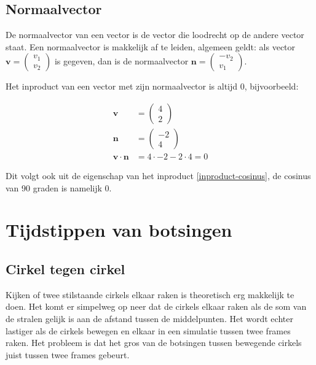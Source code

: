 \documentclass[12pt,a4paper]{article}
\begin{document}
	\subsection{Normaalvector}
	De normaalvector van een vector is de vector die loodrecht op de andere vector staat. Een normaalvector is makkelijk af te leiden, algemeen geldt: als vector $\mathbf{v}=\begin{pmatrix} v_1 \\ v_2 \end{pmatrix}$ is gegeven, dan is de normaalvector $\mathbf{n}=\begin{pmatrix} -v_2 \\ v_1 \end{pmatrix}$.
	
	Het inproduct van een vector met zijn normaalvector is altijd 0, bijvoorbeeld:
	
	\begin{equation}
		\begin{aligned}
			\mathbf{v} &= \begin{pmatrix} 4 \\ 2 \end{pmatrix}\\
			\mathbf{n} &= \begin{pmatrix} -2 \\ 4 \end{pmatrix} \\
			\mathbf{v} \cdot \mathbf{n} &= 4 \cdot -2 - 2 \cdot 4 = 0
		\end{aligned}
	\end{equation}
	
	Dit volgt ook uit de eigenschap van het inproduct \eqref{inproduct-cosinus}, de cosinus van 90 graden is namelijk 0.

	\newpage

	\section{Tijdstippen van botsingen}
	
	\subsection{Cirkel tegen cirkel}
	Kijken of twee stilstaande cirkels elkaar raken is theoretisch erg makkelijk te doen. Het komt er simpelweg op neer dat de cirkels elkaar raken als de som van de stralen gelijk is aan de afstand tussen de middelpunten. Het wordt echter lastiger als de cirkels bewegen en elkaar in een simulatie tussen twee frames raken. Het probleem is dat het gros van de botsingen tussen bewegende cirkels juist tussen twee frames gebeurt.
	
\end{document}
